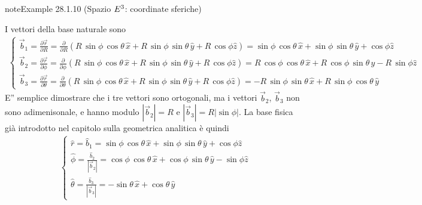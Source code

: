 \documentclass[letterpaper,10pt,italian]{jupyterBook}
\begin{document}
\begin{sphinxadmonition}{note}{Example 28.1.10 (Spazio \protect\(E^3\protect\): coordinate sferiche)}



\sphinxAtStartPar
I vettori della base naturale sono
\begin{equation*}
\begin{split}\begin{cases}
  \vec{b}_1 = \frac{\partial \vec{r}}{\partial R     } = \frac{\partial }{\partial R     } \left( R \, \sin \phi \, \cos \theta \, \hat{x} + R \, \sin \phi \, \sin \theta \, \hat{y} + R \, \cos \phi \hat{z} \right) = \sin \phi \, \cos \theta \, \hat{x} + \sin \phi \, \sin \theta \, \hat{y} +  \cos \phi \hat{z} \\
  \vec{b}_2 = \frac{\partial \vec{r}}{\partial \phi  } = \frac{\partial }{\partial \phi  } \left( R \, \sin \phi \, \cos \theta \, \hat{x} + R \, \sin \phi \, \sin \theta \, \hat{y} + R \, \cos \phi \hat{z} \right) = R \, \cos \phi \, \cos \theta \, \hat{x} + R \, \cos \phi \, \sin \theta \, \hat{y} - R \, \sin \phi \hat{z} \\
  \vec{b}_3 = \frac{\partial \vec{r}}{\partial \theta} = \frac{\partial }{\partial \theta} \left( R \, \sin \phi \, \cos \theta \, \hat{x} + R \, \sin \phi \, \sin \theta \, \hat{y} + R \, \cos \phi \hat{z} \right) = - R \, \sin \phi \, \sin \theta \, \hat{x} + R \, \sin \phi \, \cos \theta \, \hat{y}
\end{cases}\end{split}
\end{equation*}
\sphinxAtStartPar
E” semplice dimostrare che i tre vettori sono ortogonali, ma i vettori \(\vec{b}_2\), \(\vec{b}_3\) non sono adimenisonale, e hanno modulo \(|\vec{b}_2| = R\) e \(|\vec{b}_3| = R |\sin \phi|\). La base fisica \sphinxhyphen{} già introdotto nel capitolo sulla geometrica analitica   \sphinxhyphen{} è quindi
\begin{equation*}
\begin{split}\begin{cases}
  \hat{r}      = \hat{b}_1                     = \sin \phi \, \cos \theta \, \hat{x} + \sin \phi \, \sin \theta \, \hat{y} + \cos \phi \hat{z} \\
  \hat{\phi  } = \frac{\hat{b}_2}{|\vec{b}_2|} = \cos \phi \, \cos \theta \, \hat{x} + \cos \phi \, \sin \theta \, \hat{y} - \sin \phi \hat{z} \\
  \hat{\theta} = \frac{\hat{b}_3}{|\vec{b}_3|} =-\sin \theta \, \hat{x} + \cos \theta \, \hat{y}
\end{cases}\end{split}
\end{equation*}\end{sphinxadmonition}
\end{document}
